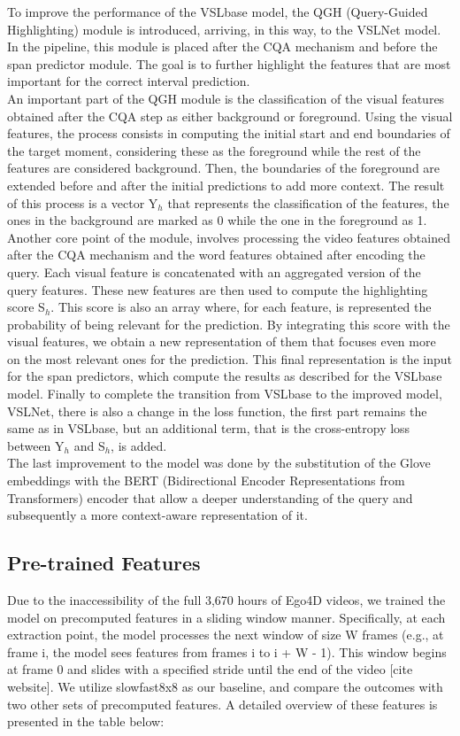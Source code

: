 \documentclass[conference]{IEEEtran}
\begin{document}
To improve the performance of the VSLbase model, the QGH (Query-Guided Highlighting) module is introduced, arriving, in this way, to the VSLNet model. In the pipeline, this module is placed after the CQA mechanism and before the span predictor module. The goal is to further highlight the features that are most important for the correct interval prediction.\\
An important part of the QGH module is the classification of the visual features obtained after the CQA step as either background or foreground. Using the visual features, the process consists in computing the initial start and end boundaries of the target moment, considering these as the foreground while the rest of the features are considered background. Then, the boundaries of the foreground are extended before and after the initial predictions to add more context. The result of this process is a vector Y$_{h}$ that represents the classification of the features, the ones in the background are marked as 0 while the one in the foreground as 1.\\
Another core point of the module, involves processing the video features obtained after the CQA mechanism and the word features obtained after encoding the query. Each visual feature is concatenated with an aggregated version of the query features​. These new features are then used to compute the highlighting score S$_{h}$​. This score is also an array where, for each feature, is represented the probability of being relevant for the prediction. By integrating this score with the visual features, we obtain a new representation of them that focuses even more on the most relevant ones for the prediction. This final representation is the input for the span predictors, which compute the results as described for the VSLbase model.
Finally to complete the transition from VSLbase to the improved model, VSLNet, there is also a change in the loss function, the first part remains the same as in VSLbase, but an additional term, that is the cross-entropy loss between Y$_{h}$ and S$_{h}$, is added.\\
The last improvement to the model was done by the substitution of the Glove embeddings with the BERT (Bidirectional Encoder Representations from Transformers) encoder that allow a deeper understanding of the query and subsequently a more context-aware representation of it.


\subsection{Pre-trained Features}
Due to the inaccessibility of the full 3,670 hours of Ego4D videos, we trained the model on precomputed features in a sliding window manner. Specifically, at each extraction point, the model processes the next window of size W frames (e.g., at frame i, the model sees features from frames i to i + W - 1). This window begins at frame 0 and slides with a specified stride until the end of the video [cite website]. We utilize slowfast8x8 as our baseline, and compare the outcomes with two other sets of precomputed features. A detailed overview of these features is presented in the table below:
\end{document}
